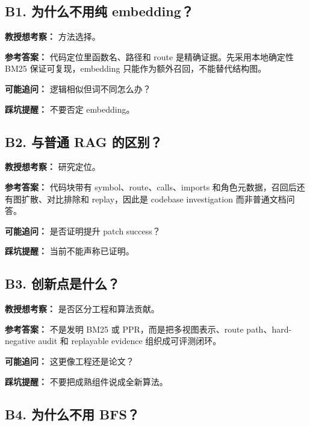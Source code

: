 \documentclass[UTF8,12pt,openany]{ctexbook}
\begin{document}
\subsection{B1. 为什么不用纯 embedding？}

\textbf{教授想考察：} 方法选择。\par

\textbf{参考答案：} 代码定位里函数名、路径和 route 是精确证据。先采用本地确定性 BM25 保证可复现，embedding 只能作为额外召回，不能替代结构图。\par

\textbf{可能追问：} 逻辑相似但词不同怎么办？\par

\textbf{踩坑提醒：} 不要否定 embedding。\par

\subsection{B2. 与普通 RAG 的区别？}

\textbf{教授想考察：} 研究定位。\par

\textbf{参考答案：} 代码块带有 symbol、route、calls、imports 和角色元数据，召回后还有图扩散、对比排除和 replay，因此是 codebase investigation 而非普通文档问答。\par

\textbf{可能追问：} 是否证明提升 patch success？\par

\textbf{踩坑提醒：} 当前不能声称已证明。\par

\subsection{B3. 创新点是什么？}

\textbf{教授想考察：} 是否区分工程和算法贡献。\par

\textbf{参考答案：} 不是发明 BM25 或 PPR，而是把多视图表示、route path、hard-negative audit 和 replayable evidence 组织成可评测闭环。\par

\textbf{可能追问：} 这更像工程还是论文？\par

\textbf{踩坑提醒：} 不要把成熟组件说成全新算法。\par

\subsection{B4. 为什么不用 BFS？}
\end{document}

